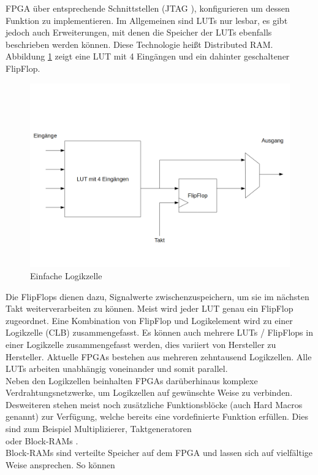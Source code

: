 FPGA über entsprechende Schnittstellen (JTAG \cite{ieeejtag:1990}),
konfigurieren um dessen Funktion zu implementieren.
Im Allgemeinen sind LUTs nur lesbar, es gibt jedoch auch Erweiterungen,
mit denen die Speicher der LUTs ebenfalls beschrieben
werden können.
Diese Technologie heißt Distributed RAM.
Abbildung \ref{lut} zeigt eine LUT mit
4 Eingängen und ein dahinter geschaltener FlipFlop.
\begin{figure}[h]
  \centering
  \includegraphics[width=\textwidth]{abb/logikzelle.png}
  \caption{Einfache Logikzelle}
  \label{lut}
\end{figure}
Die FlipFlops dienen dazu, Signalwerte
zwischenzuspeichern, um sie im nächsten Takt
weiterverarbeiten zu können. Meist wird
jeder LUT genau ein FlipFlop zugeordnet.
Eine Kombination von FlipFlop und Logikelement
wird zu einer Logikzelle (CLB) zusammengefasst.
Es können auch mehrere LUTs / FlipFlops in einer
Logikzelle zusammengefasst werden, dies variiert von
Hersteller zu Hersteller. Aktuelle FPGAs bestehen aus
mehreren zehntausend Logikzellen. Alle LUTs arbeiten
unabhängig voneinander und somit parallel.\\
Neben den Logikzellen beinhalten FPGAs darüberhinaus
komplexe Verdrahtungsnetzwerke, um Logikzellen auf
gewünschte Weise zu verbinden. Desweiteren stehen
meist noch zusätzliche Funktionsblöcke 
(auch Hard Macros genannt) zur Verfügung, welche bereits
eine vordefinierte Funktion erfüllen. Dies sind zum Beispiel
Multiplizierer, Taktgeneratoren \\ oder Block-RAMs \cite{xilinxbram:2005}.\\
Block-RAMs sind verteilte Speicher auf dem FPGA und lassen sich
auf vielfältige Weise ansprechen. So können 
